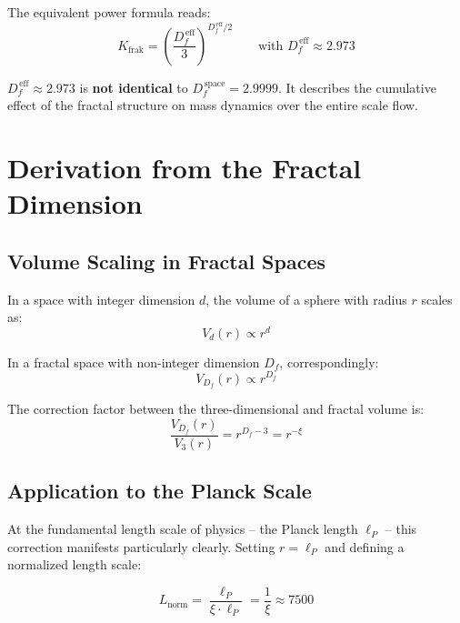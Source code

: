 	The equivalent power formula reads:
	\begin{equation}
		K_{\text{frak}} = \left(\frac{D_f^{\,\text{eff}}}{3}\right)^{\!D_f^{\,\text{eff}}/2} \qquad \text{with } D_f^{\,\text{eff}} \approx 2.973
	\end{equation}
	
	$D_f^{\,\text{eff}} \approx 2.973$ is \textbf{not identical} to $D_f^{\,\text{space}} = 2.9999$. It describes the cumulative effect of the fractal structure on mass dynamics over the entire scale flow.
	
	\section{Derivation from the Fractal Dimension}
	
	\subsection{Volume Scaling in Fractal Spaces}
	
	In a space with integer dimension $d$, the volume of a sphere with radius $r$ scales as:
	\begin{equation}
		V_d(r) \propto r^d
	\end{equation}
	
	In a fractal space with non-integer dimension $D_f$, correspondingly:
	\begin{equation}
		V_{D_f}(r) \propto r^{D_f}
		\label{eq:fractal_volume}
	\end{equation}
	
	The correction factor between the three-dimensional and fractal volume is:
	\begin{equation}
		\frac{V_{D_f}(r)}{V_3(r)} = r^{D_f - 3} = r^{-\xi}
		\label{eq:volume_correction}
	\end{equation}
	
	\subsection{Application to the Planck Scale}
	
	At the fundamental length scale of physics – the Planck length $\ell_P$ – this correction manifests particularly clearly. Setting $r = \ell_P$ and defining a normalized length scale:
	
	\begin{equation}
		L_{\text{norm}} = \frac{\ell_P}{\xi \cdot \ell_P} = \frac{1}{\xi} \approx 7500
	\end{equation}
	
